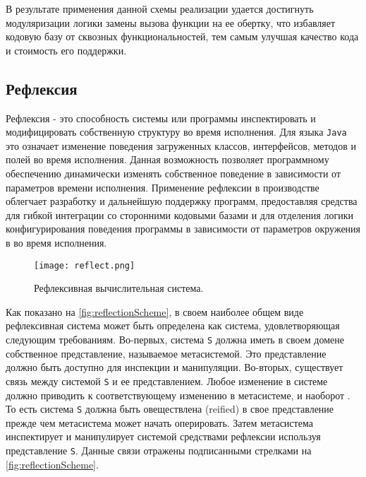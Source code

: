 В результате применения данной схемы реализации удается достигнуть модуляризации логики замены вызова функции на ее обертку, что избавляет кодовую базу от сквозных функциональностей, тем самым улучшая качество кода и стоимость его поддержки.

\subsection{Рефлексия}

Рефлексия - это способность системы или программы инспектировать и модифицировать собственную структуру во время исполнения. Для языка \texttt{Java} это означает изменение поведения загруженных классов, интерфейсов, методов и полей во время исполнения. Данная возможность позволяет программному обеспечению динамически изменять собственное поведение в зависимости от параметров времени исполнения. Применение рефлексии в производстве облегчает разработку и дальнейшую поддержку программ, предоставляя средства для гибкой интеграции со сторонними кодовыми базами и для отделения логики конфигурирования поведения программы в зависимости от параметров окружения в во время исполнения.

\begin{figure}[h]
\centering
\texttt{[image: reflect.png]}
\caption{Рефлексивная вычислительная система.}
\label{fig:reflectionScheme}
\end{figure}

Как показано на \autoref{fig:reflectionScheme}, в своем наиболее общем виде рефлексивная система может быть определена как система, удовлетворяющая следующим требованиям. Во-первых, система \texttt{S} должна иметь в своем домене собственное представление, называемое метасистемой. Это представление должно быть доступно для инспекции и манипуляции. Во-вторых, существует связь между системой \texttt{S} и ее представлением. Любое изменение в системе должно приводить к соответствующему изменению в метасистеме, и наоборот \cite{javaReflection}. То есть система \texttt{S} должна быть овеществлена (reified) в свое представление прежде чем метасистема может начать оперировать. Затем метасистема инспектирует и манипулирует системой средствами рефлексии используя представление \texttt{S}. Данные связи отражены подписанными стрелками на \autoref{fig:reflectionScheme}.

